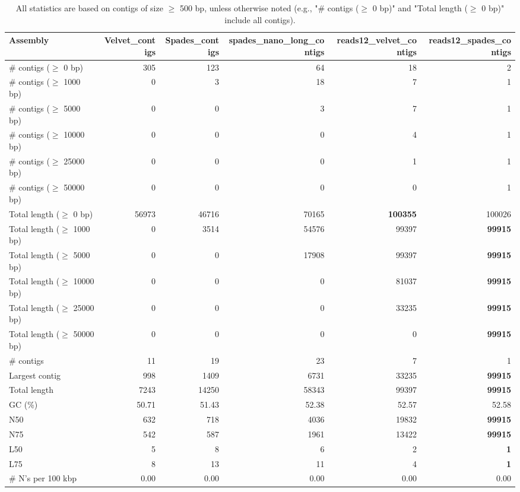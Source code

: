\documentclass[12pt,a4paper]{article}
\begin{document}
\begin{table}[ht]
\begin{center}
\caption{All statistics are based on contigs of size $\geq$ 500 bp, unless otherwise noted (e.g., "\# contigs ($\geq$ 0 bp)" and "Total length ($\geq$ 0 bp)" include all contigs).}
\begin{tabular}{|l*{5}{|r}|}
\hline
Assembly & Velvet\_contigs & Spades\_contigs & spades\_nano\_long\_contigs & reads12\_velvet\_contigs & reads12\_spades\_contigs \\ \hline
\# contigs ($\geq$ 0 bp) & 305 & 123 & 64 & 18 & 2 \\ \hline
\# contigs ($\geq$ 1000 bp) & 0 & 3 & 18 & 7 & 1 \\ \hline
\# contigs ($\geq$ 5000 bp) & 0 & 0 & 3 & 7 & 1 \\ \hline
\# contigs ($\geq$ 10000 bp) & 0 & 0 & 0 & 4 & 1 \\ \hline
\# contigs ($\geq$ 25000 bp) & 0 & 0 & 0 & 1 & 1 \\ \hline
\# contigs ($\geq$ 50000 bp) & 0 & 0 & 0 & 0 & 1 \\ \hline
Total length ($\geq$ 0 bp) & 56973 & 46716 & 70165 & {\bf 100355} & 100026 \\ \hline
Total length ($\geq$ 1000 bp) & 0 & 3514 & 54576 & 99397 & {\bf 99915} \\ \hline
Total length ($\geq$ 5000 bp) & 0 & 0 & 17908 & 99397 & {\bf 99915} \\ \hline
Total length ($\geq$ 10000 bp) & 0 & 0 & 0 & 81037 & {\bf 99915} \\ \hline
Total length ($\geq$ 25000 bp) & 0 & 0 & 0 & 33235 & {\bf 99915} \\ \hline
Total length ($\geq$ 50000 bp) & 0 & 0 & 0 & 0 & {\bf 99915} \\ \hline
\# contigs & 11 & 19 & 23 & 7 & 1 \\ \hline
Largest contig & 998 & 1409 & 6731 & 33235 & {\bf 99915} \\ \hline
Total length & 7243 & 14250 & 58343 & 99397 & {\bf 99915} \\ \hline
GC (\%) & 50.71 & 51.43 & 52.38 & 52.57 & 52.58 \\ \hline
N50 & 632 & 718 & 4036 & 19832 & {\bf 99915} \\ \hline
N75 & 542 & 587 & 1961 & 13422 & {\bf 99915} \\ \hline
L50 & 5 & 8 & 6 & 2 & {\bf 1} \\ \hline
L75 & 8 & 13 & 11 & 4 & {\bf 1} \\ \hline
\# N's per 100 kbp & 0.00 & 0.00 & 0.00 & 0.00 & 0.00 \\ \hline
\end{tabular}
\end{center}
\end{table}
\end{document}
